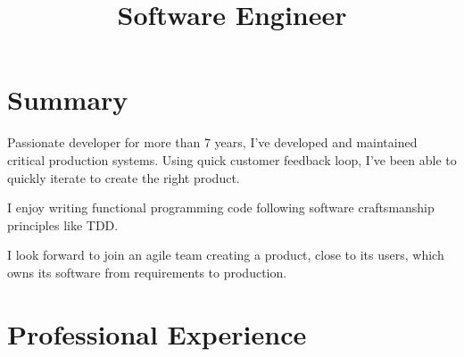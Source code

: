 \documentclass[11pt,a4paper]{moderncv}
\title{Software Engineer}
\begin{document}
\maketitle
\vspace{-10mm}
\section{Summary}
Passionate developer for more than 7 years, I've developed and maintained critical production systems. Using quick customer feedback loop, I've been able to quickly iterate to create the right product. 

I enjoy writing functional programming code following software craftsmanship principles like TDD.

I look forward to join an agile team creating a product, close to its users, which owns its software from requirements to production.

\section{Professional Experience}
\end{document}
